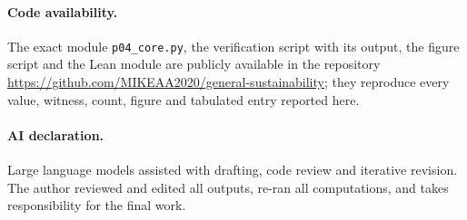 \documentclass[11pt,a4paper]{article}
\theoremstyle{plain}
\theoremstyle{definition}
\theoremstyle{remark}
\begin{document}
\paragraph{Code availability.} The exact module \texttt{p04\_core.py}, the verification script with its output, the figure script and the Lean module are publicly available in the repository \url{https://github.com/MIKEAA2020/general-sustainability}; they reproduce every value, witness, count, figure and tabulated entry reported here.
\paragraph{AI declaration.} Large language models assisted with drafting, code review and iterative revision. The author reviewed and edited all outputs, re-ran all computations, and takes responsibility for the final work.
\end{document}
